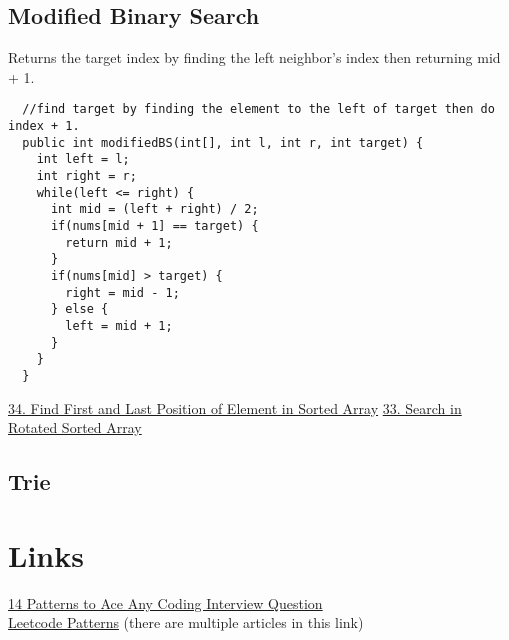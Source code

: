 \documentclass{article}
\begin{document}
  \subsection{Modified Binary Search}
  Returns the target index by finding the left neighbor's index then returning mid + 1.
  \begin{lstlisting}
  //find target by finding the element to the left of target then do index + 1.
  public int modifiedBS(int[], int l, int r, int target) {
    int left = l;
    int right = r;
    while(left <= right) {
      int mid = (left + right) / 2;
      if(nums[mid + 1] == target) {
        return mid + 1;
      }
      if(nums[mid] > target) {
        right = mid - 1;
      } else {
        left = mid + 1;
      }
    }
  }
  \end{lstlisting}
  \href{https://leetcode.com/problems/find-first-and-last-position-of-element-in-sorted-array/}{34. Find First and Last Position of Element in Sorted Array} \quad \href{https://leetcode.com/problems/search-in-rotated-sorted-array/submissions/}{33. Search in Rotated Sorted Array}
  \subsection{Trie}
  \section{Links}
  \href{https://medium.com/hackernoon/14-patterns-to-ace-any-coding-interview-question-c5bb3357f6ed}{14 Patterns to Ace Any Coding Interview Question} \\
  \href{https://medium.com/leetcode-patterns}{Leetcode Patterns} (there are multiple articles in this link)
\end{document}

